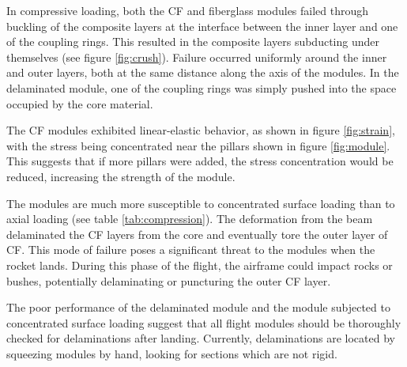 \documentclass{aiaa-tc}%
\begin{document}

In compressive loading, both the CF and fiberglass modules failed through buckling of the composite layers at the interface between the inner layer and one of the coupling rings.
This resulted in the composite layers subducting under themselves (see figure \ref{fig:crush}).
Failure occurred uniformly around the inner and outer layers, both at the same distance along the axis of the modules. 
In the delaminated module, one of the coupling rings was simply pushed into the space occupied by the core material.

The CF modules exhibited linear-elastic behavior, as shown in figure \ref{fig:strain}, with the stress being concentrated near the pillars shown in figure \ref{fig:module}.
This suggests that if more pillars were added, the stress concentration would be reduced, increasing the strength of the module.

The modules are much more susceptible to concentrated surface loading than to axial loading (see table \ref{tab:compression}). 
The deformation from the beam delaminated the CF layers from the core and eventually tore the outer layer of CF. 
This mode of failure poses a significant threat to the modules when the rocket lands. 
During this phase of the flight, the airframe could impact rocks or bushes, potentially delaminating or puncturing the outer CF layer. 

The poor performance of the delaminated module and the module subjected to concentrated surface loading suggest that all flight modules should be thoroughly checked for delaminations after landing. 
Currently, delaminations are located by squeezing modules by hand, looking for sections which are not rigid. 
\end{document}
